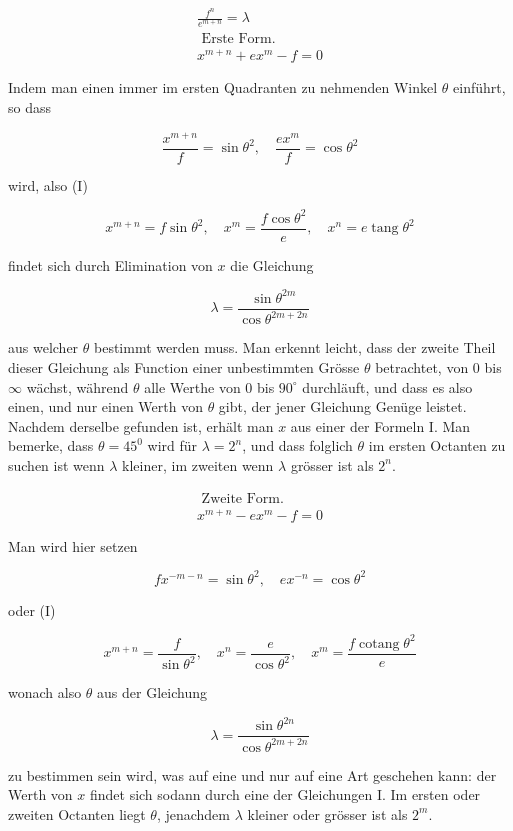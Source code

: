 \documentclass[10pt]{article}
\begin{document}
\[
\begin{gathered}
\frac{f^{n}}{e^{m+n}}=\lambda \\
\text { Erste Form. } \\
x^{m+n}+e x^{m}-f=0
\end{gathered}
\]

Indem man einen immer im ersten Quadranten zu nehmenden Winkel \(\theta\) einführt, so dass

\[
\frac{x^{m+n}}{f}=\sin \theta^{2}, \quad \frac{e x^{m}}{f}=\cos \theta^{2}
\]

wird, also (I)

\[
x^{m+n}=f \sin \theta^{2}, \quad x^{m}=\frac{f \cos \theta^{2}}{e}, \quad x^{n}=e \operatorname{tang} \theta^{2}
\]

findet sich durch Elimination von \(x\) die Gleichung

\[
\lambda=\frac{\sin \theta^{2 m}}{\cos \theta^{2 m+2 n}}
\]

aus welcher \(\theta\) bestimmt werden muss. Man erkennt leicht, dass der zweite Theil dieser Gleichung als Function einer unbestimmten Grösse \(\theta\) betrachtet, von 0
bis \(\infty\) wächst, während \(\theta\) alle Werthe von 0 bis \(90^{\circ}\) durchläuft, und dass es also einen, und nur einen Werth von \(\theta\) gibt, der jener Gleichung Genüge leistet. Nachdem derselbe gefunden ist, erhält man \(x\) aus einer der Formeln I. Man bemerke, dass \(\theta=45^{0}\) wird für \(\lambda=2^{n}\), und dass folglich \(\theta\) im ersten Octanten zu suchen ist wenn \(\lambda\) kleiner, im zweiten wenn \(\lambda\) grösser ist als \(2^{n}\).

\[
\begin{gathered}
\text { Zweite Form. } \\
x^{m+n}-e x^{m}-f=0
\end{gathered}
\]

Man wird hier setzen

\[
f x^{-m-n}=\sin \theta^{2}, \quad e x^{-n}=\cos \theta^{2}
\]

oder (I)

\[
x^{m+n}=\frac{f}{\sin \theta^{2}}, \quad x^{n}=\frac{e}{\cos \theta^{2}}, \quad x^{m}=\frac{f \operatorname{cotang} \theta^{2}}{e}
\]

wonach also \(\theta\) aus der Gleichung

\[
\lambda=\frac{\sin \theta^{2 n}}{\cos \theta^{2 m+2 n}}
\]

zu bestimmen sein wird, was auf eine und nur auf eine Art geschehen kann: der Werth von \(x\) findet sich sodann durch eine der Gleichungen I. Im ersten oder zweiten Octanten liegt \(\theta\), jenachdem \(\lambda\) kleiner oder grösser ist als \(2^{m}\).
\end{document}
